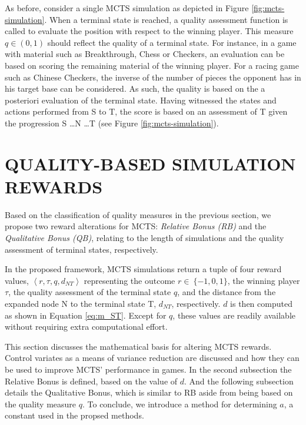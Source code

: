 \documentclass{ecai2014}
\newcommand{\tuple}[1]{\ensuremath{\left \langle #1 \right \rangle }}
\newcommand{\node}[1]{{\fontfamily{phv}\selectfont#1}}
\begin{document}
As before, consider a single MCTS simulation as depicted in Figure \ref{fig:mcts-simulation}. When a terminal state is reached, a quality assessment function is called to evaluate the position with respect to the winning player. This measure $q \in (0, 1)$ should reflect the quality of a terminal state. For instance, in a game with material such as Breakthrough, Chess or Checkers, an evaluation can be based on scoring the remaining material of the winning player. For a racing game such as Chinese Checkers, the inverse of the number of pieces the opponent has in his target base can be considered. As such, the quality is based on the a posteriori evaluation of the terminal state. Having witnessed the states and actions performed from \node{S} to \node{T}, the score is based on an assessment of \node{T} given the progression \node{S} \ldots \node{N} \ldots \node{T} (see Figure \ref{fig:mcts-simulation}).

\section{QUALITY-BASED SIMULATION REWARDS}
\label{sec:qoreward}
Based on the classification of quality measures in the previous section, we propose two reward alterations for MCTS: \emph{Relative Bonus (RB)} and the \emph{Qualitative Bonus (QB)}, relating to the length of simulations and the quality assessment of terminal states, respectively. 

In the proposed framework, MCTS simulations return a tuple of four reward values, $\tuple{r,\tau,q,d_{NT}}$ representing the outcome $r\in~\{-1, 0, 1\}$, the winning player $\tau$, the quality assessment of the terminal state $q$, and the distance from the expanded node \node{N} to the terminal state \node{T}, $d_{NT}$, respectively. $d$ is then computed as shown in Equation \ref{eq:m_ST}. Except for $q$, these values are readily available without requiring extra computational effort.

This section discusses the mathematical basis for altering MCTS rewards. Control variates as a means of variance reduction are discussed and how they can be used to improve MCTS' performance in games. In the second subsection the Relative Bonus is defined, based on the value of $d$. And the following subsection details the Qualitative Bonus, which is similar to RB aside from being based on the quality measure $q$. To conclude, we introduce a method for determining $a$, a constant used in the propsed methods.
\end{document}
